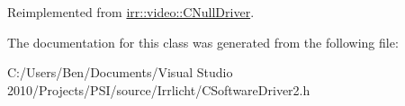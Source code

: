 Reimplemented from \hyperlink{classirr_1_1video_1_1_c_null_driver_ad8e98688587af390bead4c054cfa19f9}{irr\-::video\-::\-C\-Null\-Driver}.



The documentation for this class was generated from the following file\-:\begin{DoxyCompactItemize}
\item 
C\-:/\-Users/\-Ben/\-Documents/\-Visual Studio 2010/\-Projects/\-P\-S\-I/source/\-Irrlicht/C\-Software\-Driver2.\-h\end{DoxyCompactItemize}
